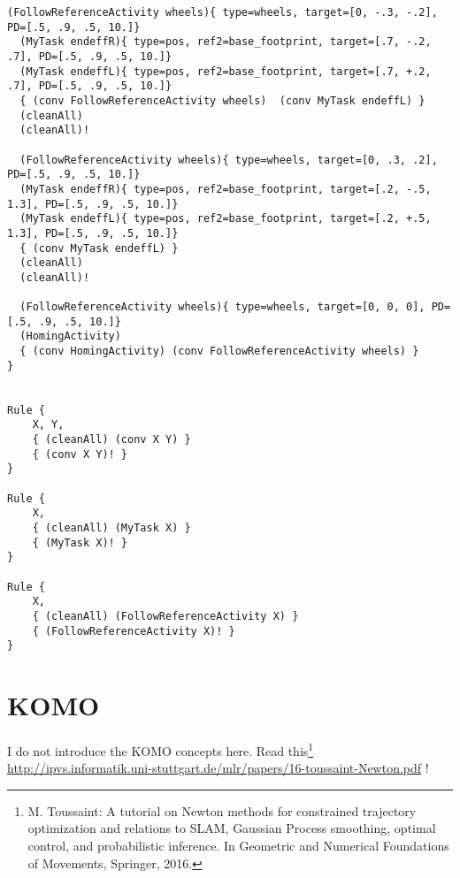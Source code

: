 \documentclass[10pt,fleqn,twoside]{article}
\begin{document}
{{\begin{shaded}
\begin{Verbatim}[fontfamily=courier,fontsize=\tiny]
  (FollowReferenceActivity wheels){ type=wheels, target=[0, -.3, -.2], PD=[.5, .9, .5, 10.]}
  (MyTask endeffR){ type=pos, ref2=base_footprint, target=[.7, -.2, .7], PD=[.5, .9, .5, 10.]}
  (MyTask endeffL){ type=pos, ref2=base_footprint, target=[.7, +.2, .7], PD=[.5, .9, .5, 10.]}
  { (conv FollowReferenceActivity wheels)  (conv MyTask endeffL) }
  (cleanAll)
  (cleanAll)!

  (FollowReferenceActivity wheels){ type=wheels, target=[0, .3, .2], PD=[.5, .9, .5, 10.]}
  (MyTask endeffR){ type=pos, ref2=base_footprint, target=[.2, -.5, 1.3], PD=[.5, .9, .5, 10.]}
  (MyTask endeffL){ type=pos, ref2=base_footprint, target=[.2, +.5, 1.3], PD=[.5, .9, .5, 10.]}
  { (conv MyTask endeffL) }
  (cleanAll)
  (cleanAll)!

  (FollowReferenceActivity wheels){ type=wheels, target=[0, 0, 0], PD=[.5, .9, .5, 10.]}
  (HomingActivity)
  { (conv HomingActivity) (conv FollowReferenceActivity wheels) }
}


Rule {
    X, Y, 
    { (cleanAll) (conv X Y) }
    { (conv X Y)! }
}

Rule {
    X, 
    { (cleanAll) (MyTask X) }
    { (MyTask X)! }
}

Rule {
    X, 
    { (cleanAll) (FollowReferenceActivity X) }
    { (FollowReferenceActivity X)! }
}
\end{Verbatim}
\end{shaded}


\section{KOMO}

I do not introduce the KOMO concepts here. Read this\footnote{
M. Toussaint: A tutorial on Newton methods for constrained trajectory
optimization and relations to SLAM, Gaussian Process smoothing,
optimal control, and probabilistic inference. In Geometric and
Numerical Foundations of Movements, Springer, 2016.}
\url{http://ipvs.informatik.uni-stuttgart.de/mlr/papers/16-toussaint-Newton.pdf} !

}}
\end{document}
